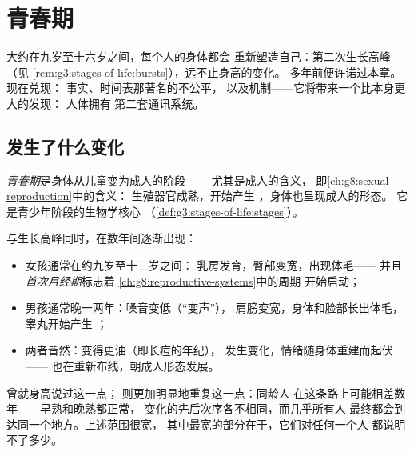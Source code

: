 \chapter{青春期}\label{ch:g8:puberty}

大约在九岁至十六岁之间，每个人的身体都会
重新塑造自己：第二次生长高峰（见
\cref{rem:g3:stages-of-life:bursts}），远不止身高的变化。
多年前便许诺过本章。现在兑现：
事实、时间表那著名的不公平，
以及机制——它将带来一个比本身更大的发现：
人体拥有
第二套通讯系统。

\section{发生了什么变化}

\begin{definition}[青春期]\label{def:g8:puberty:puberty}
\emph{青春期}是身体从儿童变为成人的阶段——
尤其是成人的含义，
即\cref{ch:g8:sexual-reproduction}中的含义：
生殖器官成熟，开始产生
\emph{}，身体也呈现成人的形态。
它是青少年阶段的生物学核心
（\cref{def:g3:stages-of-life:stages}）。
\end{definition}

\begin{proposition}[可见的变化]\label{prop:g8:puberty:changes}
与生长高峰同时，在数年间逐渐出现：
\begin{itemize}
  \item 女孩通常在约九岁至十三岁之间：
        乳房发育，臀部变宽，出现体毛——
        并且\emph{首次月经期}标志着
        \cref{ch:g8:reproductive-systems}中的周期
        开始启动；
  \item 男孩通常晚一两年：嗓音变低（“变声”），
        肩膀变宽，身体和脸部长出体毛，
        睾丸开始产生
        ；
  \item 两者皆然：变得更油（即长痘的年纪），
        发生变化，情绪随身体重建而起伏——
        也在重新布线，朝成人形态发展。
\end{itemize}
\end{proposition}
\admitted

\begin{remark}[时间表因人而异]\label{rem:g8:puberty:timetable}
曾就身高说过这一点；
则更加明显地重复这一点：同龄人
在这条路上可能相差数年——早熟和晚熟都正常，
变化的先后次序各不相同，而几乎所有人
最终都会到达同一个地方。上述范围很宽，
其中最宽的部分在于，它们对任何一个人
都说明不了多少。
\end{remark}

